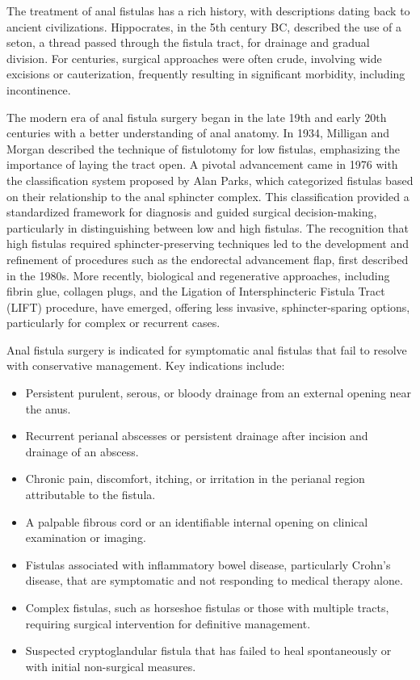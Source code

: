 The treatment of anal fistulas has a rich history, with descriptions dating back to ancient civilizations. Hippocrates, in the 5th century BC, described the use of a seton, a thread passed through the fistula tract, for drainage and gradual division. For centuries, surgical approaches were often crude, involving wide excisions or cauterization, frequently resulting in significant morbidity, including incontinence.

The modern era of anal fistula surgery began in the late 19th and early 20th centuries with a better understanding of anal anatomy. In 1934, Milligan and Morgan described the technique of fistulotomy for low fistulas, emphasizing the importance of laying the tract open. A pivotal advancement came in 1976 with the classification system proposed by Alan Parks, which categorized fistulas based on their relationship to the anal sphincter complex. This classification provided a standardized framework for diagnosis and guided surgical decision-making, particularly in distinguishing between low and high fistulas. The recognition that high fistulas required sphincter-preserving techniques led to the development and refinement of procedures such as the endorectal advancement flap, first described in the 1980s. More recently, biological and regenerative approaches, including fibrin glue, collagen plugs, and the Ligation of Intersphincteric Fistula Tract (LIFT) procedure, have emerged, offering less invasive, sphincter-sparing options, particularly for complex or recurrent cases.

Anal fistula surgery is indicated for symptomatic anal fistulas that fail to resolve with conservative management. Key indications include:
\begin{itemize}
  \item Persistent purulent, serous, or bloody drainage from an external opening near the anus.
  \item Recurrent perianal abscesses or persistent drainage after incision and drainage of an abscess.
  \item Chronic pain, discomfort, itching, or irritation in the perianal region attributable to the fistula.
  \item A palpable fibrous cord or an identifiable internal opening on clinical examination or imaging.
  \item Fistulas associated with inflammatory bowel disease, particularly Crohn's disease, that are symptomatic and not responding to medical therapy alone.
  \item Complex fistulas, such as horseshoe fistulas or those with multiple tracts, requiring surgical intervention for definitive management.
  \item Suspected cryptoglandular fistula that has failed to heal spontaneously or with initial non-surgical measures.
\end{itemize}

